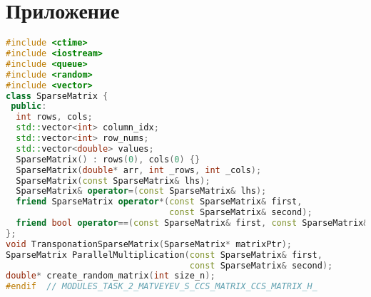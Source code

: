 \documentclass{report}
\begin{document}
\newpage

\section*{Приложение}

\begin{lstlisting}[language=C++]
#include <ctime>
#include <iostream>
#include <queue>
#include <random>
#include <vector>
class SparseMatrix {
 public:
  int rows, cols;
  std::vector<int> column_idx;
  std::vector<int> row_nums;
  std::vector<double> values;
  SparseMatrix() : rows(0), cols(0) {}
  SparseMatrix(double* arr, int _rows, int _cols);
  SparseMatrix(const SparseMatrix& lhs);
  SparseMatrix& operator=(const SparseMatrix& lhs);
  friend SparseMatrix operator*(const SparseMatrix& first,
                                const SparseMatrix& second);
  friend bool operator==(const SparseMatrix& first, const SparseMatrix& second);
};
void TransponationSparseMatrix(SparseMatrix* matrixPtr);
SparseMatrix ParallelMultiplication(const SparseMatrix& first,
                                    const SparseMatrix& second);
double* create_random_matrix(int size_n);
#endif  // MODULES_TASK_2_MATVEYEV_S_CCS_MATRIX_CCS_MATRIX_H_
\end{lstlisting}
\end{document}
